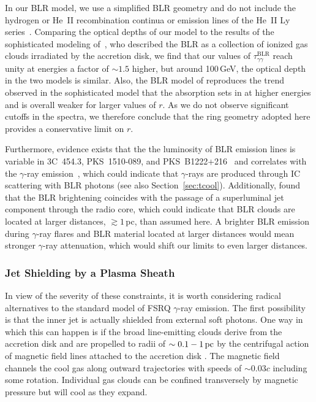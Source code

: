 \documentclass[twocolumn]{aastex62}
\newcommand{\Grays}{$\gamma$-rays\xspace}
\newcommand{\gray}{$\gamma$-ray\xspace}
\begin{document}
In our BLR model, we use a simplified BLR geometry and do not include the hydrogen or He~II recombination continua or emission lines of the He~II Ly series~\citep[as done in, e.g.,][]{2010ApJ...717L.118P,2014ApJ...794....8S}. 
Comparing the optical depths of our model to the results of the sophisticated modeling of~\citet[see, in particular, their Figure~11]{2017MNRAS.464..152A}, who described the BLR as a collection of ionized gas clouds irradiated by the accretion disk, we find that our values of $\tau_{\gamma\gamma}^\mathrm{BLR}$ reach unity at energies a factor of $\sim1.5$ higher, but around 100\,GeV, the optical depth in the two models is similar. 
Also, the BLR model of \citet{finke2016} reproduces the trend observed in the sophisticated model that the absorption sets in at higher energies and is overall weaker for larger values of $r$. 
As we do not observe significant cutoffs in the spectra, we therefore conclude that the ring geometry adopted here provides a conservative limit on $r$. 

Furthermore, evidence exists that the the luminosity of BLR emission lines is variable in 3C~454.3, PKS~1510-089, and PKS~B1222+216~\citep{2013ApJ...763L..36L,2015ApJ...804....7I} and correlates with the \gray emission~\citep{2013ApJ...763L..36L,2015IAUS..313...43L}, which could indicate that \Grays are produced through IC scattering with BLR photons (see also Section~\ref{sec:tcool}).  
Additionally, \citet{2013ApJ...763L..36L} found that the BLR brightening coincides with the passage of a superluminal jet component through the radio core, which could indicate that BLR clouds are located at larger distances, $\gtrsim 1\,$pc, than assumed here.
A brighter BLR emission during \gray flares and BLR material located at larger distances would mean stronger \gray attenuation, which would shift our limits to even larger distances. 

\subsubsection{Jet Shielding by a Plasma Sheath}
\label{sec:plasma-sheath}

In view of the severity of these constraints, it is worth considering radical alternatives to the standard model of FSRQ \gray emission. The first possibility is that the inner jet is actually shielded from external soft photons. One way in which this can happen is if the broad line-emitting clouds derive from the accretion disk and are propelled to radii of $\sim0.1-1\,{\rm pc}$ by the centrifugal action of magnetic field lines attached to the accretion disk \citep{emmering:1992mac,1994ApJ...434..446K,bottorf:1997dyn}. The magnetic field channels the cool gas along outward trajectories with speeds of $\sim0.03c$ including some rotation.  Individual gas clouds can be confined transversely by magnetic pressure but will cool as they expand. 
\end{document}
